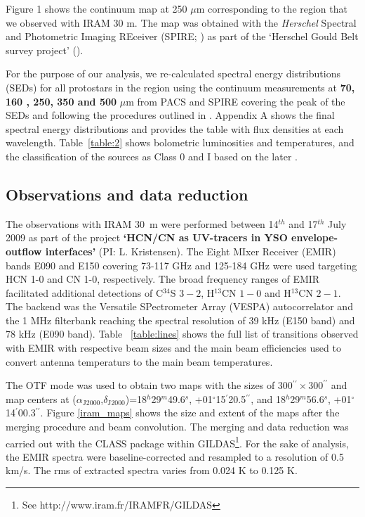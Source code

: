 \documentclass{aa}
\begin{document}
Figure 1 shows the continuum map at 250 $\mu$m corresponding to the region that we observed with 
IRAM 30 m. The map was obtained with the \textit{Herschel} Spectral and Photometric Imaging 
REceiver (SPIRE; \citealt{Gri10}) as part of the ‘Herschel Gould Belt survey project' (\citealt{And10}). 

For the purpose of our analysis, we re-calculated spectral energy distributions (SEDs) for 
all protostars in the region using the continuum measurements at \textbf{70, 160 , 250, 350 and 500} $\mu$m 
from PACS and SPIRE covering the peak of the SEDs and following the procedures outlined in \textbf{\citep{And10}}.
Appendix A shows the final spectral energy distributions and provides the table with
flux densities at each wavelength. Table~\ref{table:2} shows bolometric luminosities
and temperatures, and the classification of the sources as 
Class 0 and I based on the later \citep{Eva09}.

\subsection{Observations and data reduction}
 
The observations with IRAM 30~m were performed between 14\textbf{$^{th}$} and 17\textbf{$^{th}$} July 2009 as part of the 
project \textbf{‘HCN/CN as UV-tracers in YSO envelope-outflow interfaces’} (PI: L. Kristensen). The Eight MIxer Receiver (EMIR) 
bands E090 and E150 covering 73-117 GHz and 125-184 GHz were used targeting HCN 1-0 and 
CN 1-0, respectively. The broad frequency ranges of EMIR facilitated additional detections 
of C$^{34}$S $3-2$, H$^{13}$CN $1-0$ and H$^{13}$CN $2-1$. The
backend was the Versatile SPectrometer Array (VESPA) autocorrelator and the 1 MHz filterbank
reaching the spectral resolution of 39 kHz (E150 band) and 78 kHz (E090 band).
Table ~\ref{table:lines} shows the full list of transitions observed with EMIR with 
respective beam sizes and the main beam efficiencies used to convert antenna temperaturs 
to the main beam temperatures. 

The OTF mode was used to obtain two maps with the sizes of 300$^{\prime\prime}\times300^{\prime\prime}$ 
and map centers at ($\alpha_\mathrm{J2000}$,$\delta_\mathrm{J2000}$)=18$^h$29$^m$49.6$^s$,
+01$^{\circ}$15$^{\prime}$20.5$^{\prime\prime}$, and 18$^h$29$^m$56.6$^s$, +01$^{\circ}$14$^{\prime}$00.3$^{\prime\prime}$. 
Figure \ref{iram_maps} shows the size and extent of the maps after the merging procedure 
and beam convolution. The merging and data reduction was carried out with the CLASS package within GILDAS\footnote{See
http://www.iram.fr/IRAMFR/GILDAS}. For the sake of analysis, the EMIR spectra were
baseline-corrected and resampled to a resolution of 0.5 km/s. The rms of extracted spectra varies from 0.024 K to 0.125 K. 
\end{document}
